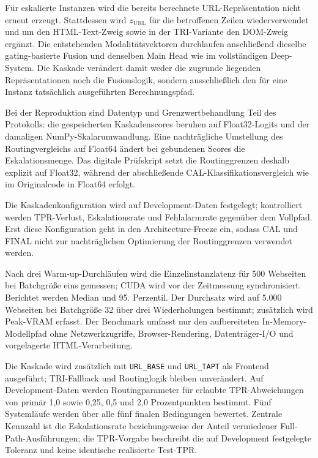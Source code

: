 Für eskalierte Instanzen wird die bereits berechnete URL-Repräsentation nicht erneut erzeugt.
Stattdessen wird $z_{\mathrm{URL}}$ für die betroffenen Zeilen wiederverwendet und um den
HTML-Text-Zweig sowie in der TRI-Variante den DOM-Zweig ergänzt. Die entstehenden
Modalitätsvektoren durchlaufen anschließend dieselbe gating-basierte Fusion und denselben Main
Head wie im vollständigen Deep-System. Die Kaskade verändert damit weder die zugrunde
liegenden Repräsentationen noch die Fusionslogik, sondern ausschließlich den für eine Instanz
tatsächlich ausgeführten Berechnungspfad.

Bei der Reproduktion sind Datentyp und Grenzwertbehandlung Teil des Protokolls: die
gespeicherten Kaskadenscores beruhen auf Float32-Logits und der damaligen
NumPy-Skalarumwandlung. Eine nachträgliche Umstellung des Routingvergleichs auf Float64
ändert bei gebundenen Scores die Eskalationsmenge. Das digitale Prüfskript setzt die
Routinggrenzen deshalb explizit auf Float32, während der abschließende
CAL-Klassifikationsvergleich wie im Originalcode in Float64 erfolgt.

Die Kaskadenkonfiguration wird auf Development-Daten festgelegt; kontrolliert werden
TPR-Verlust, Eskalationsrate und Fehlalarmrate gegenüber dem Vollpfad. Erst diese
Konfiguration geht in den Architecture-Freeze ein, sodass CAL und FINAL nicht zur
nachträglichen Optimierung der Routinggrenzen verwendet werden.

Nach drei Warm-up-Durchläufen wird die Einzelinstanzlatenz für 500 Webseiten bei Batchgröße
eins gemessen; CUDA wird vor der Zeitmessung synchronisiert. Berichtet werden Median und
95. Perzentil. Der Durchsatz wird auf 5.000 Webseiten bei Batchgröße 32 über drei
Wiederholungen bestimmt; zusätzlich wird Peak-VRAM erfasst. Der Benchmark umfasst nur den
aufbereiteten In-Memory-Modellpfad ohne Netzwerkzugriffe, Browser-Rendering,
Datenträger-I/O und vorgelagerte HTML-Verarbeitung.

Die Kaskade wird zusätzlich mit \nolinkurl{URL_BASE} und \nolinkurl{URL_TAPT} als Frontend
ausgeführt; TRI-Fallback und Routinglogik bleiben unverändert. Auf Development-Daten werden
Routingparameter für erlaubte TPR-Abweichungen von primär 1,0 sowie 0,25, 0,5 und
2,0 Prozentpunkten bestimmt. Fünf Systemläufe werden über alle fünf finalen Bedingungen
bewertet. Zentrale Kennzahl ist die Eskalationsrate beziehungsweise der Anteil vermiedener
Full-Path-Ausführungen; die TPR-Vorgabe beschreibt die auf Development festgelegte Toleranz
und keine identische realisierte Test-TPR.

